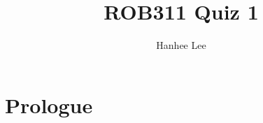 \documentclass{article}
\title{ROB311 Quiz 1}
\author{Hanhee Lee}
\begin{document}
\maketitle

\tableofcontents
\newpage

\section{Prologue}

\end{document}
